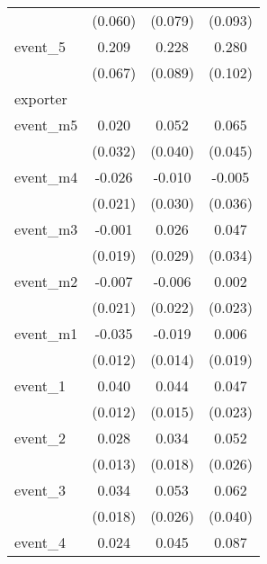 {\begin{tabular}{l*{3}{c}}
            &     (0.060)         &     (0.079)         &     (0.093)         \\
[1em]
event\_5     &       0.209\sym{**} &       0.228\sym{*}  &       0.280\sym{**} \\
            &     (0.067)         &     (0.089)         &     (0.102)         \\
\hline
exporter    &                     &                     &                     \\
event\_m5    &       0.020         &       0.052         &       0.065         \\
            &     (0.032)         &     (0.040)         &     (0.045)         \\
[1em]
event\_m4    &      -0.026         &      -0.010         &      -0.005         \\
            &     (0.021)         &     (0.030)         &     (0.036)         \\
[1em]
event\_m3    &      -0.001         &       0.026         &       0.047         \\
            &     (0.019)         &     (0.029)         &     (0.034)         \\
[1em]
event\_m2    &      -0.007         &      -0.006         &       0.002         \\
            &     (0.021)         &     (0.022)         &     (0.023)         \\
[1em]
event\_m1    &      -0.035\sym{**} &      -0.019         &       0.006         \\
            &     (0.012)         &     (0.014)         &     (0.019)         \\
[1em]
event\_1     &       0.040\sym{***}&       0.044\sym{**} &       0.047\sym{*}  \\
            &     (0.012)         &     (0.015)         &     (0.023)         \\
[1em]
event\_2     &       0.028\sym{*}  &       0.034         &       0.052\sym{*}  \\
            &     (0.013)         &     (0.018)         &     (0.026)         \\
[1em]
event\_3     &       0.034         &       0.053\sym{*}  &       0.062         \\
            &     (0.018)         &     (0.026)         &     (0.040)         \\
[1em]
event\_4     &       0.024         &       0.045         &       0.087         \\

\end{tabular}}

